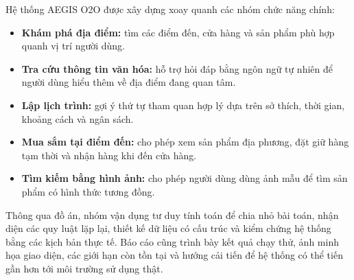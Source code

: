 \documentclass[12pt, a4paper]{article}
\begin{document}
Hệ thống AEGIS O2O được xây dựng xoay quanh các nhóm chức năng chính:
\begin{itemize}
    \item \textbf{Khám phá địa điểm:} tìm các điểm đến, cửa hàng và sản phẩm phù hợp quanh vị trí người dùng.
    \item \textbf{Tra cứu thông tin văn hóa:} hỗ trợ hỏi đáp bằng ngôn ngữ tự nhiên để người dùng hiểu thêm về địa điểm đang quan tâm.
    \item \textbf{Lập lịch trình:} gợi ý thứ tự tham quan hợp lý dựa trên sở thích, thời gian, khoảng cách và ngân sách.
    \item \textbf{Mua sắm tại điểm đến:} cho phép xem sản phẩm địa phương, đặt giữ hàng tạm thời và nhận hàng khi đến cửa hàng.
    \item \textbf{Tìm kiếm bằng hình ảnh:} cho phép người dùng dùng ảnh mẫu để tìm sản phẩm có hình thức tương đồng.

\end{itemize}

Thông qua đồ án, nhóm vận dụng tư duy tính toán để chia nhỏ bài toán, nhận diện các quy luật lặp lại, thiết kế dữ liệu có cấu trúc và kiểm chứng hệ thống bằng các kịch bản thực tế. Báo cáo cũng trình bày kết quả chạy thử, ảnh minh họa giao diện, các giới hạn còn tồn tại và hướng cải tiến để hệ thống có thể tiến gần hơn tới môi trường sử dụng thật.
\clearpage

\hypersetup{pageanchor=true}
\renewcommand{\contentsname}{\hfill MỤC LỤC \hfill}
\tableofcontents


\end{document}

